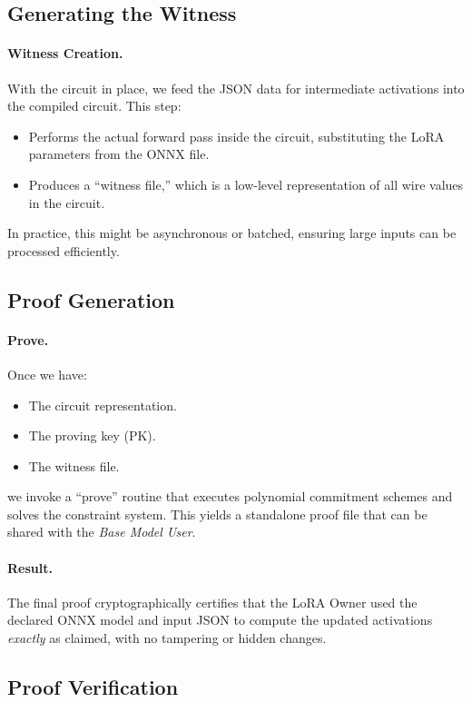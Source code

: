 \documentclass[11pt]{article}
\begin{document}
\subsection{Generating the Witness}
\paragraph{Witness Creation.}
With the circuit in place, we feed the JSON data for intermediate activations into the compiled circuit. This step:
\begin{itemize}
    \item Performs the actual forward pass inside the circuit, substituting the LoRA parameters from the ONNX file.
    \item Produces a “witness file,” which is a low-level representation of all wire values in the circuit.
\end{itemize}
In practice, this might be asynchronous or batched, ensuring large inputs can be processed efficiently.

\subsection{Proof Generation}
\paragraph{Prove.}
Once we have:
\begin{itemize}
    \item The circuit representation.
    \item The proving key (PK).
    \item The witness file.
\end{itemize}
we invoke a “prove” routine that executes polynomial commitment schemes and solves the constraint system. This yields a standalone proof file that can be shared with the \emph{Base Model User}.

\paragraph{Result.}
The final proof cryptographically certifies that the LoRA Owner used the declared ONNX model and input JSON to compute the updated activations \emph{exactly} as claimed, with no tampering or hidden changes.

\subsection{Proof Verification}
\end{document}
